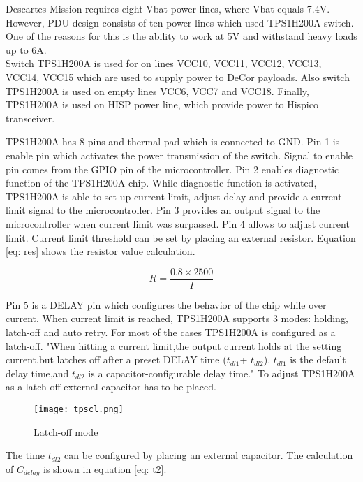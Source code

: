 Descartes Mission requires eight Vbat power lines, where Vbat equals 7.4V. However, PDU design consists of ten power lines which used TPS1H200A switch. One of the reasons for this is the ability to work at 5V and withstand heavy loads up to 6A. \\ 

Switch TPS1H200A is used for on lines VCC10, VCC11, VCC12, VCC13, VCC14, VCC15 which are used to supply power to DeCor payloads. Also switch TPS1H200A is used on empty lines VCC6, VCC7 and VCC18. Finally, TPS1H200A is used on HISP power line, which provide power to Hispico transceiver. 

TPS1H200A has 8 pins and thermal pad which is connected to GND. Pin 1 is enable pin which activates the power transmission of the switch. Signal to enable pin comes from the GPIO pin of the microcontroller. Pin 2 enables diagnostic function of the TPS1H200A chip. While diagnostic function is activated, TPS1H200A is able to set up current limit, adjust delay and provide a current limit signal to the microcontroller. Pin 3 provides an output signal to the microcontroller when current limit was surpassed. Pin 4 allows to adjust current limit. Current limit threshold can be set by placing an external resistor. Equation \ref{eq: res} shows the resistor value calculation.

\begin{equation}\label{eq: res}
R = \frac{0.8 \times 2500}{I}
\end{equation}


Pin 5 is a DELAY pin which configures the behavior of the chip while over current. When current limit is reached, TPS1H200A supports 3 modes: holding, latch-off and auto retry. For most of the cases TPS1H200A is configured as a latch-off. \cite{28} "When hitting a current limit,the output current holds at the setting current,but latches off after a preset DELAY time ($t_{dl1}$+ $t_{dl2}$). $t_{dl1}$ is the default delay time,and $t_{dl2}$ is a capacitor-configurable delay time." To adjust TPS1H200A as a latch-off external capacitor has to be placed. 

\begin{figure}[h]
	\centering
	\texttt{[image: tpscl.png]}
	\caption{Latch-off mode\cite{28}}
	\label{fig: tpscl}
\end{figure} 

The time $t_{dl2}$ can be configured by placing an external capacitor. The calculation of $C_{delay}$ is shown in equation \ref{eq: t2}.  \\

